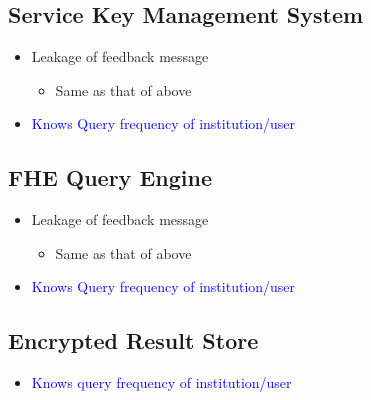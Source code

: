 \subsection{Service Key Management System}
\begin{itemize}
    \item Leakage of feedback message
          \begin{itemize}
              \item Same as that of above
          \end{itemize}
    \item \textcolor{blue}{Knows Query frequency of institution/user}
\end{itemize}

\subsection{FHE Query Engine}
\begin{itemize}
    \item Leakage of feedback message
          \begin{itemize}
              \item Same as that of above
          \end{itemize}
    \item \textcolor{blue}{Knows Query frequency of institution/user}
\end{itemize}

\subsection{Encrypted Result Store}
\begin{itemize}
    \item \textcolor{blue}{Knows query frequency of institution/user}
\end{itemize}




